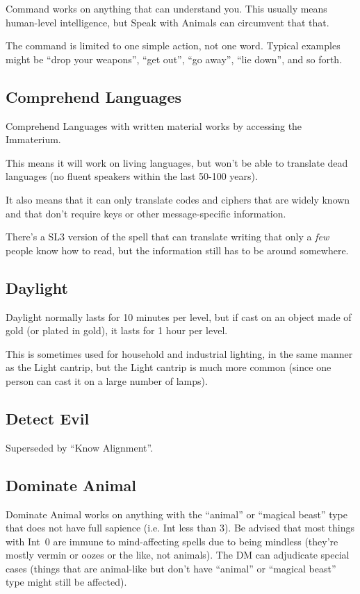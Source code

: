 Command works on anything that can understand you. This usually means
human-level intelligence, but Speak with Animals can circumvent that that.

The command is limited to one simple action, not one word. Typical
examples might be ``drop your weapons'', ``get out'', ``go away'',
``lie down'', and so forth.
%

%
\subsection{Comprehend Languages}

Comprehend Languages with written material works by accessing the
Immaterium.

This means it will work on living languages, but won't be able to translate
dead languages (no fluent speakers within the last 50-100 years).

It also means that it can only translate codes and ciphers that are widely
known and that don't require keys or other message-specific information.

There's a SL3 version of the spell that can translate writing that only a
\textit{few} people know how to read, but the information still has to be
around somewhere.
%

%
\subsection{Daylight}

Daylight normally lasts for 10 minutes per level, but if cast on an object
made of gold (or plated in gold), it lasts for 1 hour per level.

This is sometimes used for household and industrial lighting, in the same
manner as the Light cantrip, but the Light cantrip is much more common
(since one person can cast it on a large number of lamps).
%

%
\subsection{Detect Evil}

Superseded by ``Know Alignment''.
%

%
\subsection{Dominate Animal}

Dominate Animal works on anything with the ``animal'' or ``magical beast''
type that does not have full sapience (i.e. Int less than 3). Be advised
that most things with Int~0 are immune to mind-affecting spells due to
being mindless (they're mostly vermin or oozes or the like, not animals).
The DM can adjudicate special cases (things that are animal-like but don't
have ``animal'' or ``magical beast'' type might still be affected).

